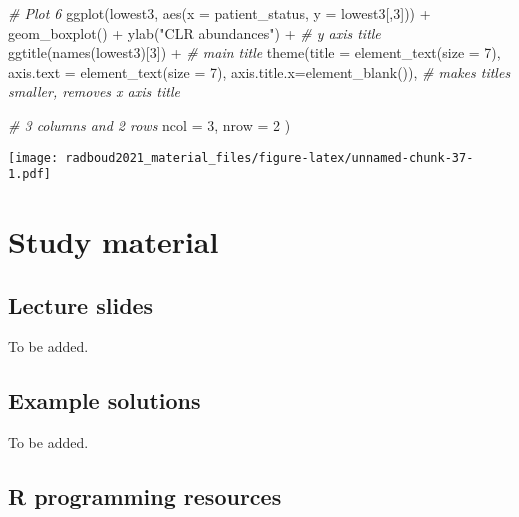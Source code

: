 \documentclass[
]{book}
\newenvironment{Shaded}{\begin{snugshade}}{\end{snugshade}}
\newcommand{\AttributeTok}[1]{\textcolor[rgb]{0.77,0.63,0.00}{#1}}
\newcommand{\CommentTok}[1]{\textcolor[rgb]{0.56,0.35,0.01}{\textit{#1}}}
\newcommand{\DecValTok}[1]{\textcolor[rgb]{0.00,0.00,0.81}{#1}}
\newcommand{\FunctionTok}[1]{\textcolor[rgb]{0.00,0.00,0.00}{#1}}
\newcommand{\NormalTok}[1]{#1}
\newcommand{\SpecialCharTok}[1]{\textcolor[rgb]{0.00,0.00,0.00}{#1}}
\newcommand{\StringTok}[1]{\textcolor[rgb]{0.31,0.60,0.02}{#1}}
\begin{document}
\begin{Shaded}
\begin{Highlighting}[]
  \CommentTok{\# Plot 6}
  \FunctionTok{ggplot}\NormalTok{(lowest3, }\FunctionTok{aes}\NormalTok{(}\AttributeTok{x =}\NormalTok{ patient\_status, }\AttributeTok{y =}\NormalTok{ lowest3[,}\DecValTok{3}\NormalTok{])) }\SpecialCharTok{+} 
    \FunctionTok{geom\_boxplot}\NormalTok{() }\SpecialCharTok{+} 
    \FunctionTok{ylab}\NormalTok{(}\StringTok{"CLR abundances"}\NormalTok{) }\SpecialCharTok{+} \CommentTok{\# y axis title}
    \FunctionTok{ggtitle}\NormalTok{(}\FunctionTok{names}\NormalTok{(lowest3)[}\DecValTok{3}\NormalTok{]) }\SpecialCharTok{+} \CommentTok{\# main title}
    \FunctionTok{theme}\NormalTok{(}\AttributeTok{title =} \FunctionTok{element\_text}\NormalTok{(}\AttributeTok{size =} \DecValTok{7}\NormalTok{),}
          \AttributeTok{axis.text =} \FunctionTok{element\_text}\NormalTok{(}\AttributeTok{size =} \DecValTok{7}\NormalTok{),}
          \AttributeTok{axis.title.x=}\FunctionTok{element\_blank}\NormalTok{()), }\CommentTok{\# makes titles smaller, removes x axis title}
  
  \CommentTok{\# 3 columns and 2 rows}
  \AttributeTok{ncol =} \DecValTok{3}\NormalTok{, }
  \AttributeTok{nrow =} \DecValTok{2}
\NormalTok{)}
\end{Highlighting}
\end{Shaded}

\texttt{[image: radboud2021\_material\_files/figure-latex/unnamed-chunk-37-1.pdf]}

\hypertarget{study-material}{%
\chapter{Study material}\label{study-material}}

\hypertarget{lecture-slides}{%
\section{Lecture slides}\label{lecture-slides}}

To be added.

\hypertarget{example-solutions-1}{%
\section{Example solutions}\label{example-solutions-1}}

To be added.

\hypertarget{r-programming-resources}{%
\section{R programming resources}\label{r-programming-resources}}
\end{document}
